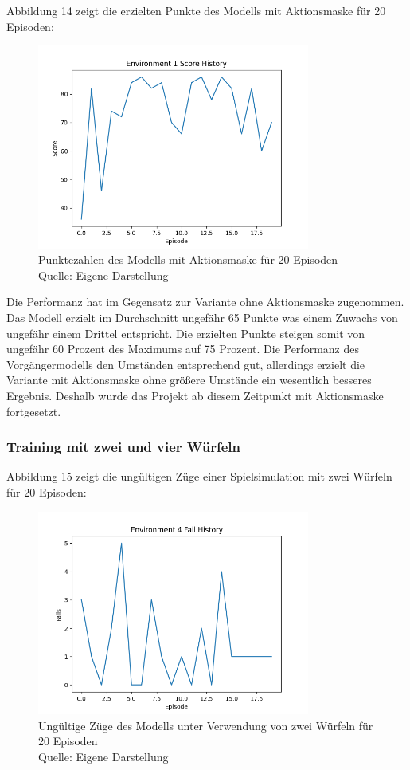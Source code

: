 Abbildung 14 zeigt die erzielten Punkte des Modells mit Aktionsmaske für 20 Episoden:
\nopagebreak
\begin{figure}[H]
	\centering
	\includegraphics[width=0.8\textwidth]{Bilder/trainingwithactionmask} 
	\caption[Punktezahlen des Modells mit Aktionsmaske für 20 Episoden]{Punktezahlen des Modells mit Aktionsmaske für 20 Episoden\\ Quelle: Eigene Darstellung}
\end{figure}

Die Performanz hat im Gegensatz zur Variante ohne Aktionsmaske zugenommen. Das Modell erzielt im Durchschnitt ungefähr 65 Punkte was einem Zuwachs von ungefähr einem Drittel entspricht. Die erzielten Punkte steigen somit von ungefähr 60 Prozent des Maximums auf 75 Prozent. Die Performanz des Vorgängermodells den Umständen entsprechend gut, allerdings erzielt die Variante mit Aktionsmaske ohne größere Umstände ein wesentlich besseres Ergebnis. Deshalb wurde das Projekt ab diesem Zeitpunkt mit Aktionsmaske fortgesetzt.
\subsubsection{Training mit zwei und vier Würfeln}
Abbildung 15 zeigt die ungültigen Züge einer Spielsimulation mit zwei Würfeln für 20 Episoden:
\nopagebreak
\begin{figure}[H]
	\centering
	\includegraphics[width=0.8\textwidth]{Bilder/failswithtwodice} 
	\caption[Ungültige Züge des Modells unter Verwendung von zwei Würfeln für 20 Episoden]{Ungültige Züge des Modells unter Verwendung von zwei Würfeln für 20 Episoden\\ Quelle: Eigene Darstellung}
\end{figure}


